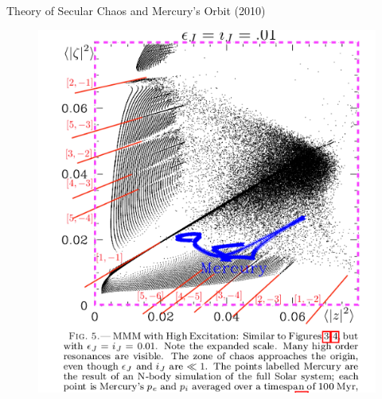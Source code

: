 \documentclass{beamer}
\begin{document}
\begin{frame}{Theory of Secular Chaos and Mercury's Orbit (2010)}
\begin{figure}[h]
\begin{minipage}[h]{0.65\linewidth}
\includegraphics[width=1\linewidth]{./10_3.png}
\end{minipage}
\end{figure}
\end{frame}
\end{document}
